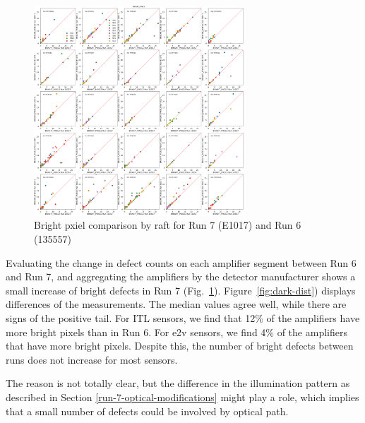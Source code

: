 \begin{figure}[H]
\begin{centering}
\includegraphics[width=0.7\textwidth]{figures/baselineCharacterization/13557_E1071_BRIGHT_PIXELS.png}
\caption{Bright pxiel comparison by raft for Run 7 (E1017) and Run 6 (135557)}
\label{fig:bright}
\end{centering}
\end{figure}

Evaluating the change in defect counts on each amplifier segment between Run 6 and Run 7, and aggregating the amplifiers by the detector manufacturer shows a small increase of bright defects in Run 7 (Fig.~\ref{fig:bright}). Figure~\ref{fig:dark-dist}) displays differences of the measurements. The median values agree well, while there are signs of the positive tail. For ITL sensors, we find that 12\% of the amplifiers have more bright pixels than in Run 6. For e2v sensors, we find 4\% of the amplifiers that have more bright pixels. Despite this, the number of bright defects between runs does not increase for most sensors.

The reason is not totally clear, but the difference in the illumination pattern as described in Section \ref{run-7-optical-modifications} might play a role, which implies that a small number of defects could be involved by optical path.

